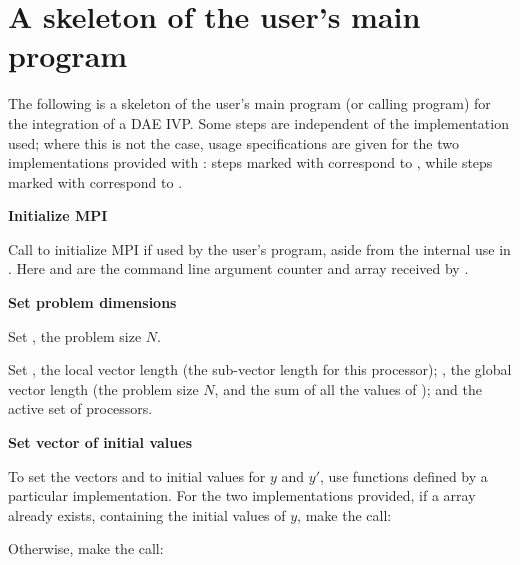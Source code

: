 \section{A skeleton of the user's main program}\label{ss:skeleton_sim}
The following is a skeleton of the user's main program (or calling
program) for the integration of a DAE IVP. Some steps are independent of the
{\nvector} implementation used; where this is not the case, usage specifications
are given for the two implementations provided with {\ida}: steps marked with {\p}
correspond to {\nvecp}, while steps marked with {\s} correspond to {\nvecs}.
\begin{Steps}
  
\item 
  {\bf {\p} Initialize MPI}

  Call  to initialize MPI if used by
  the user's program, aside from the internal use in {\nvecp}.  
  Here  and  are the command line argument 
  counter and array received by .
  
\item
  {\bf Set problem dimensions}

  {\s} Set , the problem size $N$.

  {\p} Set , the local vector length (the sub-vector
  length for this processor); , the global vector length (the
  problem size $N$, and the sum of all the values of );
  and the active set of processors.
    
\item
  {\bf Set vector of initial values}
 
  To set the vectors  and  to initial values for $y$ and $y'$, 
  use functions defined by a particular {\nvector} implementation. 
  For the two {\nvector} implementations provided, if a  
  array  
  already exists, containing the initial values of $y$, make the call:

  {\s} 

  {\p} 

  Otherwise, make the call:

  {\s} 


\end{Steps}
